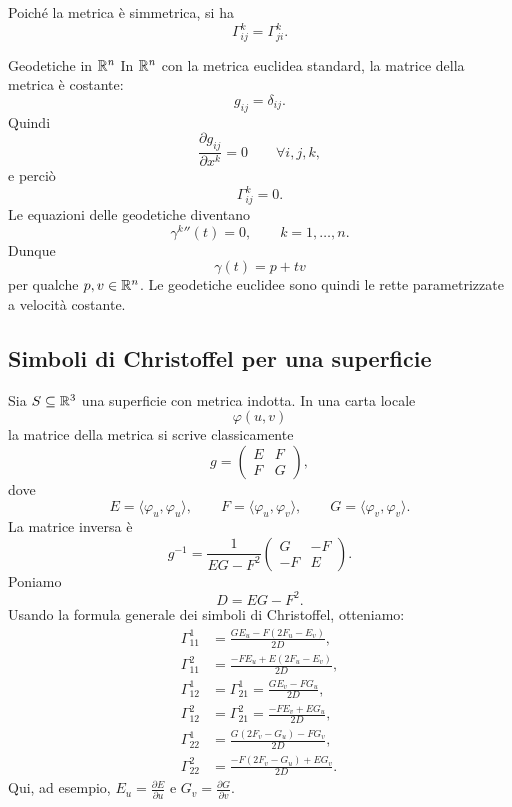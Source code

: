 \documentclass[a4paper]{article}
\begin{document}
Poiché la metrica è simmetrica, si ha
\[
    \Gamma^k_{ij}
    =
    \Gamma^k_{ji}.
\]

\begin{snippetexample}{Geodetiche in \(\mathbb{R}^n\)}
In \(\mathbb{R}^n\) con la metrica euclidea standard, la matrice della metrica è costante:
\[
    g_{ij}=\delta_{ij}.
\]
Quindi
\[
    \frac{\partial g_{ij}}{\partial x^k}=0
    \qquad
    \forall i,j,k,
\]
e perciò
\[
    \Gamma^k_{ij}=0.
\]
Le equazioni delle geodetiche diventano
\[
    \gamma^k{}''(t)=0,
    \qquad
    k=1,\ldots,n.
\]
Dunque
\[
    \gamma(t)=p+tv
\]
per qualche \(p,v\in\mathbb{R}^n\). Le geodetiche euclidee sono quindi le rette parametrizzate a velocità costante.
\end{snippetexample}

\subsection{Simboli di Christoffel per una superficie}

Sia \(S\subseteq\mathbb{R}^3\) una superficie con metrica indotta. In una carta locale
\[
    \varphi(u,v)
\]
la matrice della metrica si scrive classicamente
\[
    g
    =
    \begin{pmatrix}
        E & F\\
        F & G
    \end{pmatrix},
\]
dove
\[
    E=\langle\varphi_u,\varphi_u\rangle,
    \qquad
    F=\langle\varphi_u,\varphi_v\rangle,
    \qquad
    G=\langle\varphi_v,\varphi_v\rangle.
\]
La matrice inversa è
\[
    g^{-1}
    =
    \frac1{EG-F^2}
    \begin{pmatrix}
        G & -F\\
        -F & E
    \end{pmatrix}.
\]
Poniamo
\[
    D=EG-F^2.
\]
Usando la formula generale dei simboli di Christoffel, otteniamo:
\begin{align*}
    \Gamma^1_{11}
    &=
    \frac{G E_u-F(2F_u-E_v)}{2D},\\
    \Gamma^2_{11}
    &=
    \frac{-F E_u+E(2F_u-E_v)}{2D},\\
    \Gamma^1_{12}
    &=
    \Gamma^1_{21}
    =
    \frac{G E_v-FG_u}{2D},\\
    \Gamma^2_{12}
    &=
    \Gamma^2_{21}
    =
    \frac{-F E_v+EG_u}{2D},\\
    \Gamma^1_{22}
    &=
    \frac{G(2F_v-G_u)-F G_v}{2D},\\
    \Gamma^2_{22}
    &=
    \frac{-F(2F_v-G_u)+E G_v}{2D}.
\end{align*}
Qui, ad esempio, \(E_u=\frac{\partial E}{\partial u}\) e \(G_v=\frac{\partial G}{\partial v}\).
\end{document}
